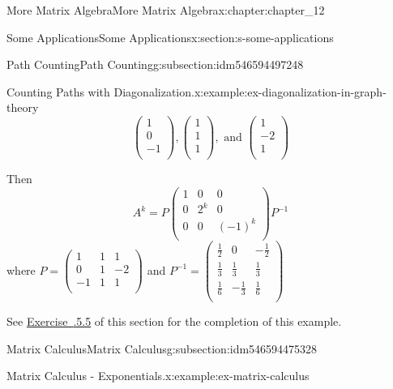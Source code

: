 \documentclass[oneside,10pt,]{book}
\newcommand{\xreffont}{\relax}
\numberwithin{equation}{section}
\begin{document}
\begin{chapterptx}{More Matrix Algebra}{}{More Matrix Algebra}{}{}{x:chapter:chapter_12}
\begin{sectionptx}{Some Applications}{}{Some Applications}{}{}{x:section:s-some-applications}
\begin{subsectionptx}{Path Counting}{}{Path Counting}{}{}{g:subsection:idm546594497248}
\begin{example}{Counting Paths with Diagonalization.}{x:example:ex-diagonalization-in-graph-theory}
\begin{equation*}
\left(
\begin{array}{c}
1 \\
0 \\
-1 \\
\end{array}
\right),\left(
\begin{array}{c}
1 \\
1 \\
1 \\
\end{array}
\right), \textrm{ and } \left(
\begin{array}{c}
1 \\
-2 \\
1 \\
\end{array}
\right)
\end{equation*}
%
\par
Then%
\begin{equation*}
A^k= P \left(
\begin{array}{ccc}
1 & 0 & 0 \\
0 & 2^k & 0 \\
0 & 0 & (-1)^k \\
\end{array}
\right)P^{-1}
\end{equation*}
where  \(P=\left(
\begin{array}{ccc}
1 & 1 & 1 \\
0 & 1 & -2 \\
-1 & 1 & 1 \\
\end{array}
\right)\)  and   \(P^{-1}=\left(
\begin{array}{ccc}
\frac{1}{2} & 0 & -\frac{1}{2} \\
\frac{1}{3} & \frac{1}{3} & \frac{1}{3} \\
\frac{1}{6} & -\frac{1}{3} & \frac{1}{6} \\
\end{array}
\right)\)%
\par
See \hyperlink{x:exercise:exercise-12-5-5}{Exercise~{\xreffont 12.5.5.5}} of this section for the completion of this example.%
\end{example}
\end{subsectionptx}
%
%
\typeout{************************************************}
\typeout{************************************************}
%
\begin{subsectionptx}{Matrix Calculus}{}{Matrix Calculus}{}{}{g:subsection:idm546594475328}
\begin{example}{Matrix Calculus - Exponentials.}{x:example:ex-matrix-calculus}%

\end{example}
\end{subsectionptx}
\end{sectionptx}
\end{chapterptx}
\end{document}
